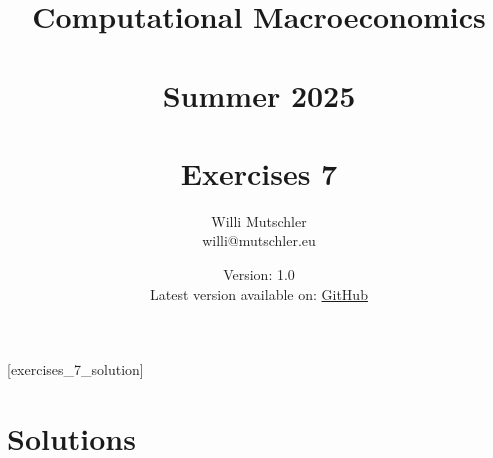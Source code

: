 
\newif\ifDisplaySolutions\DisplaySolutionstrue%


\title{Computational Macroeconomics\\~\\Summer 2025\\~\\Exercises 7}
\author{Willi Mutschler\\willi@mutschler.eu}
\date{Version: 1.0\\Latest version available on: \href{https://github.com/wmutschl/Computational-Macroeconomics/releases/latest/download/exercises_7.pdf}{GitHub}}
\maketitle\thispagestyle{empty}

\newpage
{}[exercises_7_solution]
\tableofcontents\thispagestyle{empty}\newpage

\setcounter{page}{1}
\newpage
\newpage

\printbibliography%

\newpage

\ifDisplaySolutions%
\newpage
\appendix
\section{Solutions}

\fi
